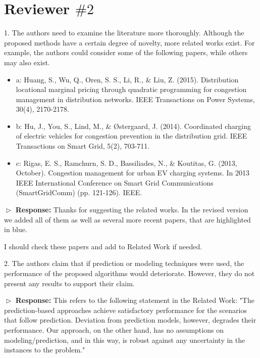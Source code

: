 \documentclass[11pt]{article}
\begin{document}
\newpage
\section{Reviewer $\# 2$}

\vspace{3mm}
{\color{blue} 1.      The authors need to examine the literature more thoroughly. Although the proposed methods have a certain degree of novelty, more related works exist. For example, the authors could consider some of the following papers, while others may also exist.

\begin{itemize}
\item a: Huang, S., Wu, Q., Oren, S. S., Li, R., \& Liu, Z. (2015). Distribution locational marginal pricing through quadratic programming for congestion management in distribution networks. IEEE Transactions on Power Systems, 30(4), 2170-2178.

\item b: Hu, J., You, S., Lind, M., \& Østergaard, J. (2014). Coordinated charging of electric vehicles for congestion prevention in the distribution grid. IEEE Transactions on Smart Grid, 5(2), 703-711.

\item c: Rigas, E. S., Ramchurn, S. D., Bassiliades, N., \& Koutitas, G. (2013, October). Congestion management for urban EV charging systems. In 2013 IEEE International Conference on Smart Grid Communications (SmartGridComm) (pp. 121-126). IEEE.

\end{itemize}
}
\vspace{3mm}

$\vartriangleright$ \noindent\textbf{Response:} 
Thanks for suggesting the related works. In the revised version we added all of them as well as several more recent papers, that are highlighted in blue. 

{\color{red} I should check these papers and add to Related Work if needed.}

\vspace{3mm}
{\color{blue} 2. The authors claim that if prediction or modeling techniques were used, the performance of the proposed algorithms would deteriorate. However, they do not present any results to support their claim.  }
\vspace{3mm}

$\vartriangleright$ \noindent\textbf{Response:} 
This refers to the following statement in the Related Work: "The prediction-based approaches achieve satisfactory performance for the scenarios that follow prediction. Deviation from prediction models, however, degrades their performance.
Our approach, on the other hand, has no assumptions on modeling/prediction, and in this way, is robust against any uncertainty in the instances to the problem." 
\end{document}
